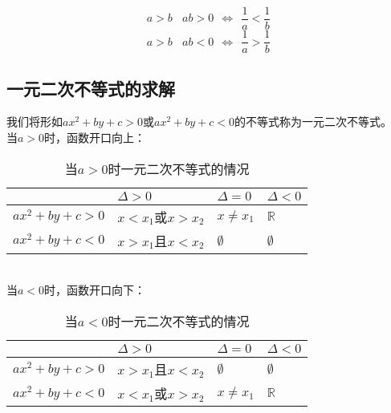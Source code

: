 \documentclass[UTF8]{ctexart}
\begin{document}
    \begin{large}
        \begin{equation*}
            a>b~~~~ab>0~~\Leftrightarrow~~\frac{1}{a}<\frac{1}{b}
        \end{equation*}
        \vspace{5pt}
        \begin{equation*}
            a>b~~~~ab<0~~\Leftrightarrow~~\frac{1}{a}>\frac{1}{b}
        \end{equation*}
    \end{large}

\newpage

\subsection{一元二次不等式的求解}
    我们将形如$ax^2+by+c>0$或$ax^2+by+c<0$的不等式称为一元二次不等式。\\[5mm]
    当$a>0$时，函数开口向上：\vspace{5pt}
    \begin{table}[h]
        \begin{center}
            \begin{tabular}{l|l|l|l}
                \hline
                &$\Delta>0$\qquad\qquad\qquad\qquad&$\Delta=0$\qquad\qquad\qquad\qquad&$\Delta<0$\qquad\qquad\qquad\qquad \\ \hline
                $ax^2+by+c>0$\qquad&$x<x_1$或$x>x_2$&$x\neq x_1$&$\mathbb{R}$\\ \hline
                $ax^2+by+c<0$\qquad&$x>x_1$且$x<x_2$&$\emptyset$&$\emptyset$\\ \hline
            \end{tabular}
            \caption{当$a>0$时一元二次不等式的情况}
        \end{center}
    \end{table}\\
    当$a<0$时，函数开口向下：\vspace{5pt}
    \begin{table}[h]
        \begin{center}
            \begin{tabular}{l|l|l|l}
                \hline
                &$\Delta>0$\qquad\qquad\qquad\qquad&$\Delta=0$\qquad\qquad\qquad\qquad&$\Delta<0$\qquad\qquad\qquad\qquad \\ \hline
                $ax^2+by+c>0$\qquad&$x>x_1$且$x<x_2$&$\emptyset$&$\emptyset$\\ \hline
                $ax^2+by+c<0$\qquad&$x<x_1$或$x>x_2$&$x\neq x_1$&$\mathbb{R}$\\ \hline
            \end{tabular}
            \caption{当$a<0$时一元二次不等式的情况}
        \end{center}
    \end{table}
\end{document}
